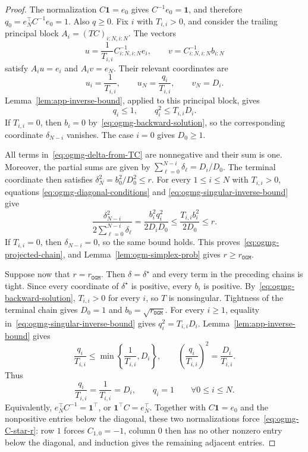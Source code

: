 \documentclass[11pt]{article}
\begin{document}
\begin{proof}
The normalization $C\mathbf1=e_0$ gives $C^{-1}e_0=\mathbf1$, and therefore
$q_0=e_N^\top C^{-1}e_0=1$. Also $q\geq0$.
Fix $i$ with $T_{i,i}>0$, and consider the trailing principal block
$A_i=(TC)_{i:N,i:N}$. The vectors
\[
u=\frac1{T_{i,i}}C_{i:N,i:N}^{-1}e_i,
\qquad
v=C_{i:N,i:N}^{-1}b_{i:N}
\]
satisfy $A_iu=e_i$ and $A_iv=e_N$.
Their relevant coordinates are
\[
u_i=\frac1{T_{i,i}},
\qquad
u_N=\frac{q_i}{T_{i,i}},
\qquad
v_N=D_i.
\]
Lemma~\ref{lem:app-inverse-bound}, applied to this principal block, gives
\begin{equation}\label{eq:ogmg-singular-inverse-bound}
q_i\leq1,
\qquad
q_i^2\leq T_{i,i}D_i.
\end{equation}
If $T_{i,i}=0$, then $b_i=0$ by~\eqref{eq:ogmg-backward-solution}, so the
corresponding coordinate $\delta_{N-i}$ vanishes. The case $i=0$ gives
$D_0\geq1$.

All terms in~\eqref{eq:ogmg-delta-from-TC} are nonnegative and their sum is
one. Moreover, the partial sums are given by $\sum_{\ell=0}^{N-i}\delta_\ell= D_i/D_0$.
The terminal coordinate then satisfies $\delta_N^2= b_0^2/D_0^2\leq r$.
For every $1\leq i\leq N$ with $T_{i,i}>0$, equations
\eqref{eq:ogmg-diagonal-conditions} and
\eqref{eq:ogmg-singular-inverse-bound} give
\[
\frac{\delta_{N-i}^2}
{2\sum_{\ell=0}^{N-i}\delta_\ell}
=
\frac{b_i^2q_i^2}{2D_iD_0}
\leq
\frac{T_{i,i}b_i^2}{2D_0}
\leq r.
\]
If $T_{i,i}=0$, then $\delta_{N-i}=0$, so the same bound holds.
This proves~\eqref{eq:ogmg-projected-chain}, and
Lemma~\ref{lem:ogm-simplex-prob} gives $r\geq r_\mathtt{OGM}$.

Suppose now that $r=r_\mathtt{OGM}$. Then
$\delta=\delta^\star$ and every term in the preceding chains is tight. Since
every coordinate of $\delta^\star$ is positive, every $b_i$ is positive.
By~\eqref{eq:ogmg-backward-solution}, $T_{i,i}>0$ for every $i$, so $T$ is
nonsingular. Tightness of the
terminal chain gives $D_0=1$ and $b_0=\sqrt{r_\mathtt{OGM}}$.
For every $i\geq1$, equality in~\eqref{eq:ogmg-singular-inverse-bound}
gives $q_i^2=T_{i,i}D_i$. Lemma~\ref{lem:app-inverse-bound} gives
\[
    \frac{q_i}{T_{i,i}}
    \leq\min\left\{\frac1{T_{i,i}},D_i\right\},
    \qquad
    \left(\frac{q_i}{T_{i,i}}\right)^2=\frac{D_i}{T_{i,i}}.
\]
Thus
\[
    \frac{q_i}{T_{i,i}}=\frac1{T_{i,i}}=D_i,
    \qquad
    q_i=1
    \qquad \forall 0\leq i\leq N.
\]
Equivalently, $e_N^\top C^{-1}=\mathbf1^\top$, or
$\mathbf1^\top C=e_N^\top$. Together with $C\mathbf1=e_0$ and the nonpositive
entries below the diagonal, these two normalizations force~\eqref{eq:ogmg-C-star-r}:
row $1$ forces $C_{1,0}=-1$, column $0$ then has no other nonzero entry below the diagonal,
and induction gives the remaining adjacent entries.


\end{proof}
\end{document}
